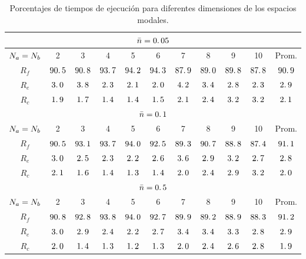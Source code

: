 \begin{table}[h]
\begin{tabular}{|c|c|c|c|c|c|c|c|c|c|c|}
\hline
\hline \multicolumn{11}{|c|}{$\bar{n}=0\ldotp 05$}\\
\hline $N_a=N_b$ & 2&3&4&5&6&7&8&9&10&Prom.\\
\hline $R_f$ & $ 90\ldotp 5$ & $ 90\ldotp 8$ & $ 93\ldotp 7$ & $ 94\ldotp 2$ & $ 94\ldotp 3$ & $ 87\ldotp 9$ & $ 89\ldotp 0$ & $ 89\ldotp 8$ & $ 87\ldotp 8$ & $ 90\ldotp 9$\\
\hline $R_e$ & $  3\ldotp 0$ & $  3\ldotp 8$ & $  2\ldotp 3$ & $  2\ldotp 1$ & $  2\ldotp 0$ & $  4\ldotp 2$ & $  3\ldotp 4$ & $  2\ldotp 8$ & $  2\ldotp 3$ & $  2\ldotp 9$\\
\hline $R_c$ & $  1\ldotp 9$ & $  1\ldotp 7$ & $  1\ldotp 4$ & $  1\ldotp 4$ & $  1\ldotp 5$ & $  2\ldotp 1$ & $  2\ldotp 4$ & $  3\ldotp 2$ & $  3\ldotp 2$ & $  2\ldotp 1$\\
\hline
\hline \multicolumn{11}{|c|}{$\bar{n}=0\ldotp 1$}\\
\hline $N_a=N_b$ & 2&3&4&5&6&7&8&9&10&Prom.\\
\hline $R_f$ & $ 90\ldotp 5$ & $ 93\ldotp 1$ & $ 93\ldotp 7$ & $ 94\ldotp 0$ & $ 92\ldotp 5$ & $ 89\ldotp 3$ & $ 90\ldotp 7$ & $ 88\ldotp 8$ & $ 87\ldotp 4$ & $ 91\ldotp 1$\\
\hline $R_e$ & $  3\ldotp 0$ & $  2\ldotp 5$ & $  2\ldotp 3$ & $  2\ldotp 2$ & $  2\ldotp 6$ & $  3\ldotp 6$ & $  2\ldotp 9$ & $  3\ldotp 2$ & $  2\ldotp 7$ & $  2\ldotp 8$\\
\hline $R_c$ & $  2\ldotp 1$ & $  1\ldotp 6$ & $  1\ldotp 4$ & $  1\ldotp 3$ & $  1\ldotp 4$ & $  2\ldotp 0$ & $  2\ldotp 4$ & $  2\ldotp 9$ & $  3\ldotp 2$ & $  2\ldotp 0$\\
\hline
\hline \multicolumn{11}{|c|}{$\bar{n}=0\ldotp 5$}\\
\hline $N_a=N_b$ & 2&3&4&5&6&7&8&9&10&Prom.\\
\hline $R_f$ & $ 90\ldotp 8$ & $ 92\ldotp 8$ & $ 93\ldotp 8$ & $ 94\ldotp 0$ & $ 92\ldotp 7$ & $ 89\ldotp 9$ & $ 89\ldotp 2$ & $ 88\ldotp 9$ & $ 88\ldotp 3$ & $ 91\ldotp 2$\\
\hline $R_e$ & $  3\ldotp 0$ & $  2\ldotp 9$ & $  2\ldotp 4$ & $  2\ldotp 2$ & $  2\ldotp 7$ & $  3\ldotp 4$ & $  3\ldotp 4$ & $  3\ldotp 3$ & $  2\ldotp 8$ & $  2\ldotp 9$\\
\hline $R_c$ & $  2\ldotp 0$ & $  1\ldotp 4$ & $  1\ldotp 3$ & $  1\ldotp 2$ & $  1\ldotp 3$ & $  2\ldotp 0$ & $  2\ldotp 4$ & $  2\ldotp 6$ & $  2\ldotp 8$ & $  1\ldotp 9$\\
\hline
\end{tabular}\caption{Porcentajes de tiempos de ejecuci\'on para diferentes dimensiones de los espacios modales.}\label{tabla:tiempos_prop_por_rutina}
\end{table}
